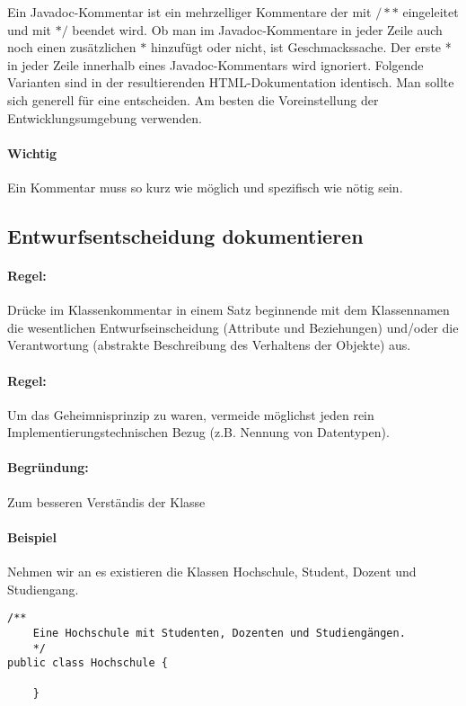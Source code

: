 Ein Javadoc-Kommentar ist ein mehrzelliger Kommentare der mit $/**$ eingeleitet und mit $*/$ beendet wird. Ob man im Javadoc-Kommentare in jeder Zeile auch noch einen zusätzlichen $*$ hinzufügt oder nicht, ist Geschmackssache. Der erste * in jeder Zeile innerhalb eines Javadoc-Kommentars wird ignoriert. Folgende Varianten sind in der resultierenden HTML-Dokumentation identisch. Man sollte sich generell für eine entscheiden. Am besten die Voreinstellung der Entwicklungsumgebung verwenden.

\paragraph{Wichtig} Ein Kommentar muss so kurz wie möglich und spezifisch wie nötig sein.

\subsection{Entwurfsentscheidung dokumentieren}

\paragraph{Regel:} Drücke im Klassenkommentar in einem Satz beginnende mit dem Klassennamen die wesentlichen Entwurfseinscheidung (Attribute und Beziehungen) und/oder die Verantwortung (abstrakte Beschreibung des Verhaltens der Objekte) aus.
\paragraph{Regel:} Um das Geheimnisprinzip zu waren, vermeide möglichst jeden rein Implementierungstechnischen Bezug (z.B. Nennung von Datentypen).
\paragraph{Begründung:} Zum besseren Verständis der Klasse

\paragraph{Beispiel} Nehmen wir an es existieren die Klassen Hochschule, Student, Dozent und Studiengang.\par

\begin{lstlisting}
/**
	Eine Hochschule mit Studenten, Dozenten und Studiengängen.
	*/
public class Hochschule {

	}
\end{lstlisting}

